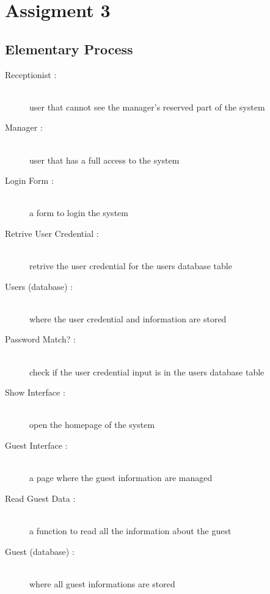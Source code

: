 \section{Assigment 3}



\subsection{Elementary Process}

\begin{description}
  
  \item[Receptionist :] \hfill \\ user that cannot see the manager's reserved part of the system

  \item[Manager :] \hfill \\ user that has a full access to the system
    
  \item[Login Form :] \hfill \\ a form to login the system
    
  \item[Retrive User Credential :] \hfill \\ retrive the user credential for the users database table
    
  \item[Users (database) :] \hfill \\ where the user credential and information are stored

  \item[Password Match? :] \hfill \\ check if the user credential input is in the users database table

  \item[Show Interface :] \hfill \\ open the homepage of the system
    
  \item[Guest Interface :] \hfill \\ a page where the guest information are managed

  \item[Read Guest Data :] \hfill \\ a function to read all the information about the guest
    
  \item[Guest (database) :] \hfill \\ where all guest informations are stored
    

\end{description}
